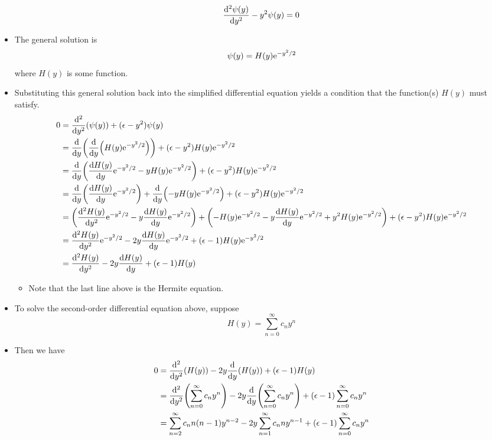 \documentclass[../notes.tex]{subfiles}
\begin{document}
\begin{itemize}
    \begin{equation*}
        \dv[2]{\psi(y)}{y}-y^2\psi(y) = 0
    \end{equation*}
    \item {}The general solution is
    \begin{equation*}
        \psi(y) = H(y)\e[-y^2/2]
    \end{equation*}
    where $H(y)$ is some function.
    \item Substituting this general solution back into the simplified differential equation yields a condition that the function(s) $H(y)$ must satisfy.
    \begin{align*}
        0 &= \dv[2]{y}(\psi(y))+(\epsilon-y^2)\psi(y)\\
        &= \dv{y}(\dv{y}(H(y)\e[-y^2/2]))+(\epsilon-y^2)H(y)\e[-y^2/2]\\
        &= \dv{y}(\dv{H(y)}{y}\e[-y^2/2]-yH(y)\e[-y^2/2])+(\epsilon-y^2)H(y)\e[-y^2/2]\\
        &= \dv{y}(\dv{H(y)}{y}\e[-y^2/2])+\dv{y}(-yH(y)\e[-y^2/2])+(\epsilon-y^2)H(y)\e[-y^2/2]\\
        &= \left( \dv[2]{H(y)}{y}\e[-y^2/2]-y\dv{H(y)}{y}\e[-y^2/2] \right)+\left( -H(y)\e[-y^2/2]-y\dv{H(y)}{y}\e[-y^2/2]+y^2H(y)\e[-y^2/2] \right)+(\epsilon-y^2)H(y)\e[-y^2/2]\\
        &= \dv[2]{H(y)}{y}\e[-y^2/2]-2y\dv{H(y)}{y}\e[-y^2/2]+(\epsilon-1)H(y)\e[-y^2/2]\\
        &= \dv[2]{H(y)}{y}-2y\dv{H(y)}{y}+(\epsilon-1)H(y)
    \end{align*}
    \begin{itemize}
        \item Note that the last line above is the Hermite equation.
    \end{itemize}
    \item To solve the second-order differential equation above, suppose
    \begin{equation*}
        H(y) = \sum_{n=0}^\infty c_ny^n
    \end{equation*}
    \item Then we have
    \begingroup
    \allowdisplaybreaks
    \begin{align*}
        0 &= \dv[2]{y}(H(y))-2y\dv{y}(H(y))+(\epsilon-1)H(y)\\
        &= \dv[2]{y}(\sum_{n=0}^\infty c_ny^n)-2y\dv{y}(\sum_{n=0}^\infty c_ny^n)+(\epsilon-1)\sum_{n=0}^\infty c_ny^n\\
        &= \sum_{n=2}^\infty c_nn(n-1)y^{n-2}-2y\sum_{n=1}^\infty c_nny^{n-1}+(\epsilon-1)\sum_{n=0}^\infty c_ny^n\\

\end{align*}
\end{itemize}
\end{document}
